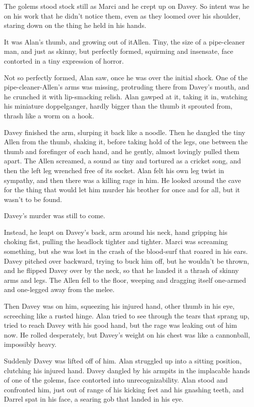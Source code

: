 The golems stood stock still as Marci and he crept up on Davey.  So
intent was he on his work that he didn't notice them, even as they
loomed over his shoulder, staring down on the thing he held in his
hands.

It was Alan's thumb, and growing out of it\dash{}Allen.  Tiny, the size of
a pipe-cleaner man, and just as skinny, but perfectly formed,
squirming and insensate, face contorted in a tiny expression of
horror.

Not so perfectly formed, Alan saw, once he was over the initial shock. 
One of the pipe-cleaner-Allen's arms was missing, protruding there
from Davey's mouth, and he crunched it with lip-smacking relish.  Alan
gawped at it, taking it in, watching his miniature doppelganger,
hardly bigger than the thumb it sprouted from, thrash like a worm on a
hook.

Davey finished the arm, slurping it back like a noodle.  Then he
dangled the tiny Allen from the thumb, shaking it, before taking hold
of the legs, one between the thumb and forefinger of each hand, and he
gently, almost lovingly pulled them apart.  The Allen screamed, a
sound as tiny and tortured as a cricket song, and then the left leg
wrenched free of its socket.  Alan felt his own leg twist in sympathy,
and then there was a killing rage in him.  He looked around the cave
for the thing that would let him murder his brother for once and for
all, but it wasn't to be found.

Davey's murder was still to come.

Instead, he leapt on Davey's back, arm around his neck, hand gripping
his choking fist, pulling the headlock tighter and tighter.  Marci was
screaming something, but she was lost in the crash of the blood-surf
that roared in his ears.  Davey pitched over backward, trying to buck
him off, but he wouldn't be thrown, and he flipped Davey over by the
neck, so that he landed it a thrash of skinny arms and legs.  The
Allen fell to the floor, weeping and dragging itself one-armed and
one-legged away from the melee.

Then Davey was on him, squeezing his injured hand, other thumb in his
eye, screeching like a rusted hinge.  Alan tried to see through the
tears that sprang up, tried to reach Davey with his good hand, but the
rage was leaking out of him now.  He rolled desperately, but Davey's
weight on his chest was like a cannonball, impossibly heavy.

Suddenly Davey was lifted off of him.  Alan struggled up into a
sitting position, clutching his injured hand.  Davey dangled by his
armpits in the implacable hands of one of the golems, face contorted
into unrecognizability.  Alan stood and confronted him, just out of
range of his kicking feet and his gnashing teeth, and Darrel spat in
his face, a searing gob that landed in his eye.

